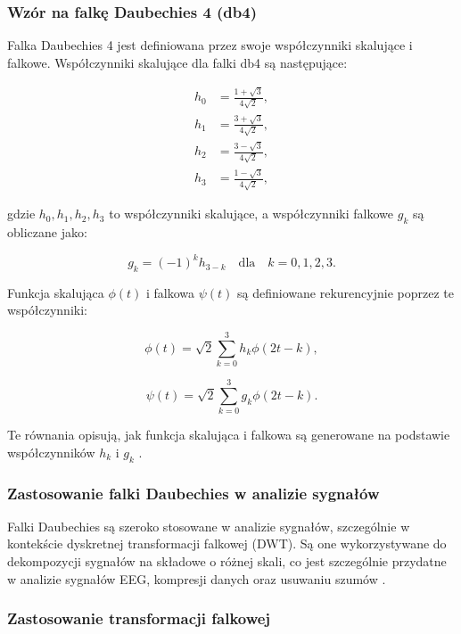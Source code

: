 \documentclass[eeg_v4.tex]{subfiles}
\begin{document}
    \subsubsection{Wzór na falkę Daubechies 4 (db4)}
    Falka Daubechies 4 jest definiowana przez swoje współczynniki skalujące i falkowe. Współczynniki skalujące dla falki
    db4 są następujące:

    \[
        \begin{aligned}
            h_0 &= \frac{1 + \sqrt{3}}{4\sqrt{2}}, \\
            h_1 &= \frac{3 + \sqrt{3}}{4\sqrt{2}}, \\
            h_2 &= \frac{3 - \sqrt{3}}{4\sqrt{2}}, \\
            h_3 &= \frac{1 - \sqrt{3}}{4\sqrt{2}},
        \end{aligned}
    \]

    gdzie \( h_0, h_1, h_2, h_3 \) to współczynniki skalujące, a współczynniki falkowe \( g_k \) są obliczane jako:

    \[
        g_k = (-1)^k h_{3-k} \quad \text{dla} \quad k = 0, 1, 2, 3.
    \]

    Funkcja skalująca \( \phi(t) \) i falkowa \( \psi(t) \) są definiowane rekurencyjnie poprzez te współczynniki:

    \[
        \phi(t) = \sqrt{2} \sum_{k=0}^{3} h_k \phi(2t - k),
    \]

    \[
        \psi(t) = \sqrt{2} \sum_{k=0}^{3} g_k \phi(2t - k).
    \]

    Te równania opisują, jak funkcja skalująca i falkowa są generowane na podstawie współczynników \( h_k \) i \( g_k \)
    \cite{daubechies1992}.

    \subsubsection{Zastosowanie falki Daubechies w analizie sygnałów}
    Falki Daubechies są szeroko stosowane w analizie sygnałów, szczególnie w kontekście dyskretnej transformacji
    falkowej (DWT). Są one wykorzystywane do dekompozycji sygnałów na składowe o różnej skali, co jest szczególnie
    przydatne w analizie sygnałów EEG, kompresji danych oraz usuwaniu szumów \cite{mallat1999}.

    \subsubsection{Zastosowanie transformacji falkowej}
\end{document}
